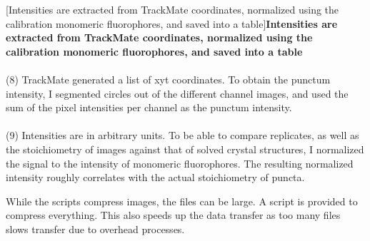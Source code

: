 \begin{centering}
\captionsetup{parbox=none}
[Intensities are extracted from TrackMate coordinates, normalized using the calibration monomeric fluorophores, and saved into a table]{\textbf{Intensities are extracted from TrackMate coordinates, normalized using the calibration monomeric fluorophores, and saved into a table}
\\
\\
(8) TrackMate generated a list of xyt coordinates. To obtain the punctum intensity, I segmented circles out of the different channel images, and used the sum of the pixel intensities per channel as the punctum intensity.
\\
\\
(9) Intensities are in arbitrary units. To be able to compare replicates, as well as the stoichiometry of images against that of solved crystal structures, I normalized the signal to the intensity of monomeric fluorophores. The resulting normalized intensity roughly correlates with the actual stoichiometry of puncta.}
\label{m:5}
\end{centering}

While the scripts compress images, the files can be large. A script is provided to compress everything. This also speeds up the data transfer as too many files slows transfer due to overhead processes.

